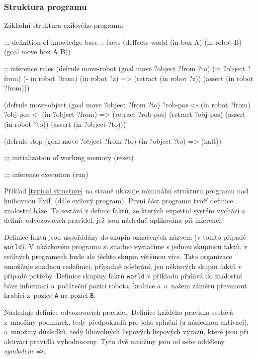 \subsubsection{Struktura programu}

\begin{listing}[h]
\caption{Základní struktura exilového programu}
\label{typical structure}
\begin{clcode}
;;; definition of knowledge base
;; facts
(deffacts world
  (in box A)
  (in robot B)
  (goal move box A B))

;; inference rules
(defrule move-robot
  (goal move ?object ?from ?to)
  (in ?object ?from)
  (- in robot ?from)
  (in robot ?z)
  =>
  (retract (in robot ?z))
  (assert (in robot ?from)))

(defrule move-object
  (goal move ?object ?from ?to)
  ?rob-pos <- (in robot ?from)
  ?obj-pos <- (in ?object ?from)
  =>
  (retract ?rob-pos)
  (retract ?obj-pos)
  (assert (in robot ?to))
  (assert (in ?object ?to)))

(defrule stop
  (goal move ?object ?from ?to)
  (in ?object ?to)
  =>
  (halt))

;;; initialization of working memory
(reset)

;;; inference execution
(run)
\end{clcode}
\end{listing}

Příklad \ref{typical structure} na straně \pageref{typical structure} ukazuje
minimální strukturu programu nad knihovnou ExiL (dále exilový program). První
část programu tvoří definice znalostní báze. Ta sestává z definic faktů, ze
kterých expertní systém vychází a definic odvozovacích pravidel, jež jsou
následně aplikována při inferenci.

Definice faktů jsou uspořádány do skupin označených názvem (v tomto případě
\verb|world|). V ukázkovém programu si snadno vystačíme s jednou skupinou faktů,
v reálných programech bude ale těchto skupin většinou více. Tato organizace
umožňuje snadnou redefinici, případně odebrání, jen některých skupin faktů v
případě potřeby.  Definice skupiny faktů \verb|world| v příkladu přidává do
znalostní báze informaci o~počáteční pozici robota, krabice a~o~našem záměru
přesunout krabici z~pozice \verb|A| na pozici \verb|B|.

Následuje definice odvozovacích pravidel. Definice každého pravidla sestává
z~množiny podmínek, tedy předpokladů pro jeho splnění (a následnou aktivaci),
a~množiny důsledků, tedy libovolných lispových lispových výrazů, které jsou při
aktivaci pravidla vyhodnoceny.  Tyto dvě množiny jsou od sebe odděleny
\emph{symbolem}~\verb|=>|.

